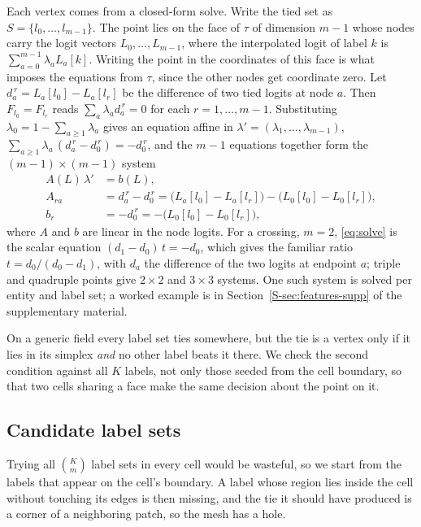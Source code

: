 \documentclass{egpubl}
\newcommand{\sref}[1]{\ref*{S-#1}}
\newcommand{\supp}[1]{Section~\sref{#1} of the supplementary material}
\theoremstyle{definition}
\newcommand{\tet}{\tau}
\newcommand{\interp}{F}
\begin{document}
Each vertex comes from a closed-form solve. Write the tied set as
$S = \{l_0,\dots,l_{m-1}\}$.
The point lies on the face of $\tet$ of dimension $m-1$ whose nodes carry the
logit vectors $L_0,\dots,L_{m-1}$, where the interpolated logit of label $k$
is $\sum_{a=0}^{m-1} \lambda_a L_a[k]$. Writing the point in the coordinates
of this face is what imposes the equations from $\tet$, since the other nodes
get coordinate zero. Let
$d_a^{\,r} = L_a[l_0] - L_a[l_r]$ be the difference of two tied logits at
node $a$. Then $\interp_{l_0} = \interp_{l_r}$ reads
$\sum_a \lambda_a d_a^{\,r} = 0$ for each $r = 1,\dots,m-1$. Substituting
$\lambda_0 = 1 - \sum_{a \ge 1} \lambda_a$ gives an equation affine in
$\lambda' = (\lambda_1,\dots,\lambda_{m-1})$,
$\sum_{a \ge 1} \lambda_a\,(d_a^{\,r} - d_0^{\,r}) = -d_0^{\,r}$, and the
$m-1$ equations together form the $(m-1) \times (m-1)$ system
\begin{align}
  A(L)\,\lambda' &= b(L), \label{eq:solve} \\
  A_{r a} &= d_a^{\,r} - d_0^{\,r}
           = \big(L_a[l_0] - L_a[l_r]\big)
             - \big(L_0[l_0] - L_0[l_r]\big), \nonumber \\
  b_r &= -d_0^{\,r} = -\big(L_0[l_0]-L_0[l_r]\big), \nonumber
\end{align}
where $A$ and $b$ are linear in the node logits. For a crossing, $m=2$,
\eqref{eq:solve} is the scalar equation $(d_1 - d_0)\,t = -d_0$, which gives
the familiar ratio $t = d_0/(d_0-d_1)$, with $d_a$ the difference of the two
logits at endpoint $a$; triple and quadruple points give $2\times2$ and
$3\times3$ systems. One such system is solved per entity and label set; a
worked example is in \supp{sec:features-supp}.

On a generic field every label set ties somewhere, but the tie is a vertex
only if it lies in its simplex \emph{and} no other label beats it there. We check the second
condition against all $K$ labels, not only those seeded from the cell
boundary, so that two cells sharing a face make the same decision about the
point on it.

\subsection{Candidate label sets}
\label{sec:candidates}

Trying all $\binom{K}{m}$ label sets in every cell would be wasteful, so we
start from the labels that appear on the cell's boundary. A label whose
region lies inside the cell without touching its edges is then missing, and
the tie it should have produced is a corner of a neighboring patch, so the
mesh has a hole.
\end{document}
